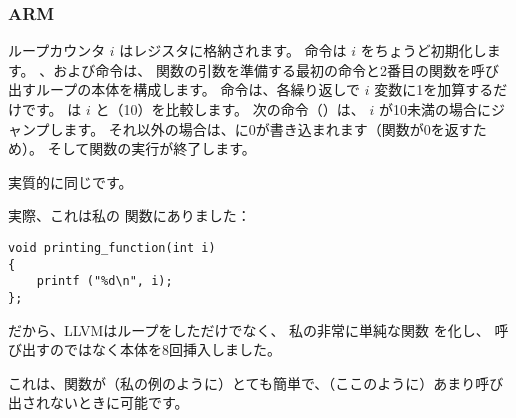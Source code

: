 ﻿\subsubsection{ARM}

\myparagraph{\NonOptimizingKeilVI (\ARMMode)}



ループカウンタ $i$ はレジスタに格納されます。
命令は $i$ をちょうど初期化します。 
、および命令は、
\ttf 関数の引数を準備する最初の命令と2番目の関数を呼び出すループの本体を構成します。 
命令は、各繰り返しで $i$ 変数に1を加算するだけです。 
は $i$ と（10）を比較します。 
次の命令（）は、 $i$ が10未満の場合にジャンプします。
それ以外の場合は、に0が書き込まれます（関数が0を返すため）。
そして関数の実行が終了します。

\myparagraph{\OptimizingKeilVI (\ThumbMode)}



実質的に同じです。

\myparagraph{\OptimizingXcodeIV (\ThumbTwoMode)}
\label{ARM_unrolled_loops}



実際、これは私の \ttf 関数にありました：

\begin{lstlisting}[style=customc]
void printing_function(int i)
{
    printf ("%d\n", i);
};
\end{lstlisting}

だから、LLVMはループをしただけでなく、
私の非常に単純な関数 \ttf を化し、
呼び出すのではなく本体を8回挿入しました。

これは、関数が（私の例のように）とても簡単で、（ここのように）あまり呼び出されないときに可能です。






